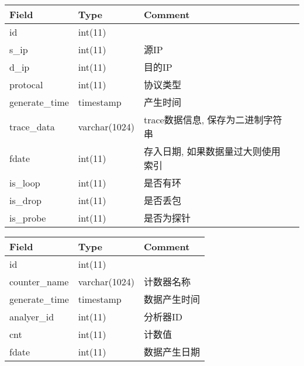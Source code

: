 {\begin{mdframed}[everyline=true]
\begin{center}
    \begin{tabular}{llll}   \hline
    Field          & Type          & Comment                   \\ \hline
    id             & int(11)       &                           \\
    s\_ip          & int(11)       & 源IP                       \\
    d\_ip          & int(11)       & 目的IP                      \\
    protocal       & int(11)       & 协议类型                      \\
    generate\_time & timestamp     & 产生时间                      \\
    trace\_data    & varchar(1024) & trace数据信息, 保存为二进制字符串    \\
    fdate          & int(11)       & 存入日期, 如果数据量过大则使用索引 \\
    is\_loop       & int(11)       & 是否有环                      \\
    is\_drop       & int(11)       & 是否丢包                      \\
    is\_probe      & int(11)       & 是否为探针                    \\ \hline
    \end{tabular}
    \label{tbl_traffic_data}
\end{center}


\begin{center}
    \label{tbl_counter}
    \begin{tabular}{lll} \hline
    Field          & Type          & Comment \\ \hline
    id             & int(11)       &         \\
    counter\_name  & varchar(1024) & 计数器名称   \\
    generate\_time & timestamp     & 数据产生时间  \\
    analyer\_id    & int(11)       & 分析器ID   \\
    cnt            & int(11)       & 计数值     \\
    fdate          & int(11)       & 数据产生日期  \\ \hline
    \end{tabular}
\end{center}



\end{mdframed}}
